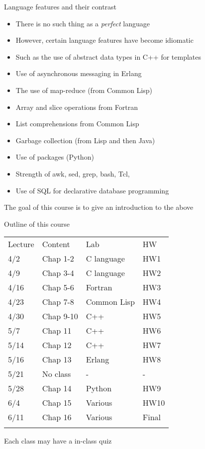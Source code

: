 \documentclass[bigger]{beamer}
\begin{document}
\begin{frame}[label=sec-4]{Language features and their contrast}
\begin{itemize}[<+->]
\item There is no such thing as a \emph{perfect} language
\item However, certain language features have become idiomatic
\item Such as the use of abstract data types in C++ for templates
\item Use of asynchronous messaging in Erlang
\item The use of map-reduce (from Common Lisp)
\item Array and slice operations from Fortran
\item List comprehensions from Common Lisp
\item Garbage collection (from Lisp and then Java)
\item Use of packages (Python)
\item Strength of awk, sed, grep, bash, Tcl,
\item Use of SQL for declarative database programming
\end{itemize}
\end{frame}

\begin{frame}[label=sec-5]{The goal of this course is to give an introduction to the above}
\end{frame}

\begin{frame}[label=sec-6]{Outline of this course}
\begin{center}
\begin{tabular}{llll}
Lecture & Content & Lab & HW\\
4/2 & Chap 1-2 & C language & HW1\\
4/9 & Chap 3-4 & C language & HW2\\
4/16 & Chap 5-6 & Fortran & HW3\\
4/23 & Chap 7-8 & Common Lisp & HW4\\
4/30 & Chap 9-10 & C++ & HW5\\
5/7 & Chap 11 & C++ & HW6\\
5/14 & Chap 12 & C++ & HW7\\
5/16 & Chap 13 & Erlang & HW8\\
5/21 & No class & - & -\\
5/28 & Chap 14 & Python & HW9\\
6/4 & Chap 15 & Various & HW10\\
6/11 & Chap 16 & Various & Final\\
 &  &  & \\
\end{tabular}
\end{center}

\begin{block}{Each class may have a in-class quiz}
\end{block}
\end{frame}
\end{document}
